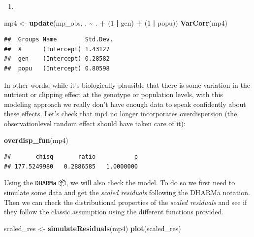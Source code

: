 \documentclass[
  12pt,
]{book}
\newenvironment{Shaded}{\begin{snugshade}}{\end{snugshade}}
\newcommand{\DecValTok}[1]{\textcolor[rgb]{0.00,0.00,0.81}{#1}}
\newcommand{\KeywordTok}[1]{\textcolor[rgb]{0.13,0.29,0.53}{\textbf{#1}}}
\newcommand{\NormalTok}[1]{#1}
\newcommand{\OperatorTok}[1]{\textcolor[rgb]{0.81,0.36,0.00}{\textbf{#1}}}
\newcommand{\StringTok}[1]{\textcolor[rgb]{0.31,0.60,0.02}{#1}}
\providecommand{\tightlist}{%
  \setlength{\itemsep}{0pt}\setlength{\parskip}{0pt}}
\begin{document}
\begin{enumerate}
\def\labelenumi{\arabic{enumi}.}
\setcounter{enumi}{2}
\tightlist
\item
\end{enumerate}

\begin{Shaded}
\begin{Highlighting}[]
\NormalTok{mp4 \textless{}{-}}\StringTok{ }\KeywordTok{update}\NormalTok{(mp\_obs, . }\OperatorTok{\textasciitilde{}}\StringTok{ }\NormalTok{. }\OperatorTok{+}\StringTok{ }\NormalTok{(}\DecValTok{1} \OperatorTok{|}\StringTok{ }\NormalTok{gen) }\OperatorTok{+}\StringTok{ }\NormalTok{(}\DecValTok{1} \OperatorTok{|}\StringTok{ }\NormalTok{popu))}
\KeywordTok{VarCorr}\NormalTok{(mp4)}
\end{Highlighting}
\end{Shaded}

\begin{verbatim}
##  Groups Name        Std.Dev.
##  X      (Intercept) 1.43127 
##  gen    (Intercept) 0.28582 
##  popu   (Intercept) 0.80598
\end{verbatim}

In other words, while it's biologically plausible that there is some variation in the nutrient or clipping effect at the genotype or population levels, with this modeling approach we really don't have enough data to speak confidently about these effects.
Let's check that mp4 no longer incorporates overdispersion (the observationlevel random effect should have taken care of it):

\begin{Shaded}
\begin{Highlighting}[]
\KeywordTok{overdisp\_fun}\NormalTok{(mp4)}
\end{Highlighting}
\end{Shaded}

\begin{verbatim}
##       chisq       ratio           p 
## 177.5249980   0.2886585   1.0000000
\end{verbatim}

Using the \texttt{DHARMa} 📦, we will also check the model. To do so we first need to simulate some data and get the \emph{scaled residuals} following the DHARMa notation.
Then we can check the distributional properties of the \emph{scaled residuals} and see if they follow the classic assumption using the different functions provided.

\begin{Shaded}
\begin{Highlighting}[]
\NormalTok{scaled\_res \textless{}{-}}\StringTok{ }\KeywordTok{simulateResiduals}\NormalTok{(mp4)}
\KeywordTok{plot}\NormalTok{(scaled\_res)}
\end{Highlighting}
\end{Shaded}
\end{document}
